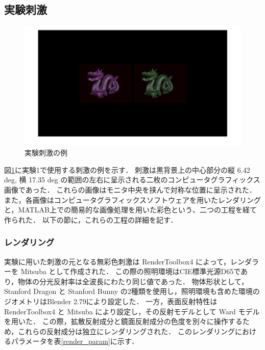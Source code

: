         \subsection{実験刺激}

            \begin{figure}[h]
                \centering
                \includegraphics[width=14.0cm]{./img/ex1_stimuli.png}
                \caption{実験刺激の例}
                \label{ex1_stimuli}
            \end{figure}

            図\ref{ex1_stimuli}に実験1で使用する刺激の例を示す．
            刺激は黒背景上の中心部分の縦 6.42 deg, 横 17.35 deg の範囲の左右に呈示される二枚のコンピュータグラフィックス画像であった．
            これらの画像はモニタ中央を挟んで対称な位置に呈示された．
            また，各画像はコンピュータグラフィックスソフトウェアを用いたレンダリングと，MATLAB上での簡易的な画像処理を用いた彩色という、二つの工程を経て作られた．
            以下の節に，これらの工程の詳細を記す．

            \subsubsection{レンダリング}

                実験に用いた刺激の元となる無彩色刺激は RenderToolbox4 によって，レンダラーを Mitsuba\cite{Mitsuba} として作成された．
                この際の照明環境はCIE標準光源D65であり，物体の分光反射率は全波長にわたり同じ値であった．
                物体形状として，Stanford Dragon と Stanford Bunny \cite{StanfordModels} の2種類を使用し，照明環境も含めた環境のジオメトリはBlender 2.79により設定した．
                一方，表面反射特性は RenderToolbox4 と Mitsuba により設定し，その反射モデルとして Ward モデル\cite{Ward}を用いた．
                この際，拡散反射成分と鏡面反射成分の色度を別々に操作するため，これらの反射成分は独立にレンダリングされた．
                このレンダリングにおけるパラメータを表\ref{render_param}に示す．

